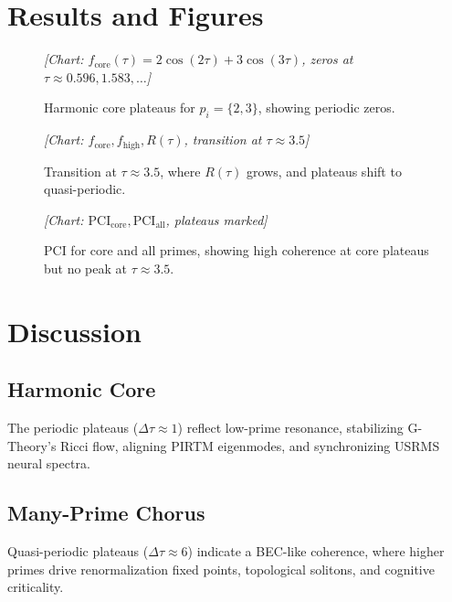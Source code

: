 \documentclass[11pt]{article}
\theoremstyle{definition}
\begin{document}
\section{Results and Figures}
\begin{figure}[h]
    \centering
    \caption{Harmonic core plateaus for \( p_i = \{2, 3\} \), showing periodic zeros.}
    \label{fig:core}
    \textit{[Chart: \( f_{\text{core}}(\tau) = 2 \cos(2\tau) + 3 \cos(3\tau) \), zeros at \( \tau \approx 0.596, 1.583, \ldots \)]}
\end{figure}

\begin{figure}[h]
    \centering
    \caption{Transition at \( \tau \approx 3.5 \), where \( R(\tau) \) grows, and plateaus shift to quasi-periodic.}
    \label{fig:transition}
    \textit{[Chart: \( f_{\text{core}}, f_{\text{high}}, R(\tau) \), transition at \( \tau \approx 3.5 \)]}
\end{figure}

\begin{figure}[h]
    \centering
    \caption{PCI for core and all primes, showing high coherence at core plateaus but no peak at \( \tau \approx 3.5 \).}
    \label{fig:pci}
    \textit{[Chart: \( \text{PCI}_{\text{core}}, \text{PCI}_{\text{all}} \), plateaus marked]}
\end{figure}

\section{Discussion}
\subsection{Harmonic Core}
The periodic plateaus (\( \Delta \tau \approx 1 \)) reflect low-prime resonance, stabilizing G-Theory’s Ricci flow, aligning PIRTM eigenmodes, and synchronizing USRMS neural spectra.

\subsection{Many-Prime Chorus}
Quasi-periodic plateaus (\( \Delta \tau \approx 6 \)) indicate a BEC-like coherence, where higher primes drive renormalization fixed points, topological solitons, and cognitive criticality.
\end{document}
